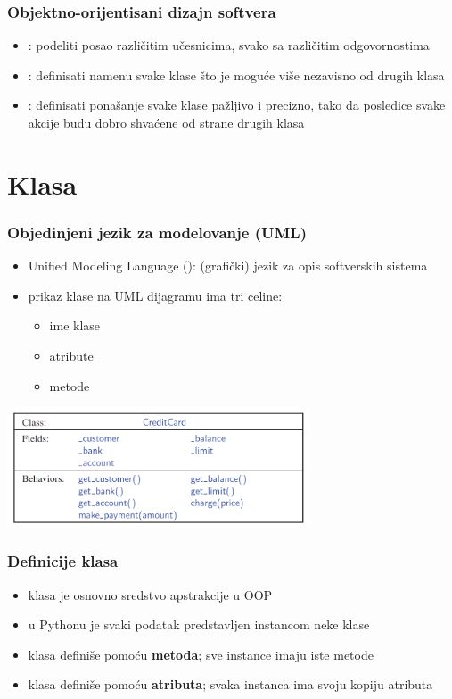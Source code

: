 \documentclass[compress,aspectratio=169]{beamer}
\begin{document}
\begin{frame}[fragile]
  \frametitle{Objektno-orijentisani dizajn softvera}
  \begin{itemize}
    \item {}: podeliti posao različitim učesnicima, svako sa različitim odgovornostima
    \item {}: definisati namenu svake klase što je moguće više nezavisno od drugih klasa
    \item {}: definisati ponašanje svake klase pažljivo i precizno, tako da posledice svake akcije budu dobro shvaćene od strane drugih klasa
  \end{itemize}
\end{frame}

\section[Klasa]{Klasa}
\begin{frame}[fragile]
  \frametitle{Objedinjeni jezik za modelovanje (UML)}
  \begin{itemize}
    \item Unified Modeling Language (): (grafički) jezik za opis softverskih sistema
    \item prikaz klase na UML dijagramu ima tri celine:
    \begin{itemize}
      \item ime klase
      \item atribute
      \item metode 
    \end{itemize}
  \end{itemize}
  \begin{center}
    \includegraphics[width=9cm]{asp-03-pic03.png}
  \end{center}
\end{frame}

\begin{frame}[fragile]
  \frametitle{Definicije klasa}
  \begin{itemize}
    \item klasa je osnovno sredstvo apstrakcije u OOP
    \item u Pythonu je svaki podatak predstavljen instancom neke klase
    \item klasa definiše  pomoću \textbf{metoda}; sve instance imaju iste metode
    \item klasa definiše  pomoću \textbf{atributa}; svaka instanca ima svoju kopiju atributa
  \end{itemize}
\end{frame}
\end{document}

